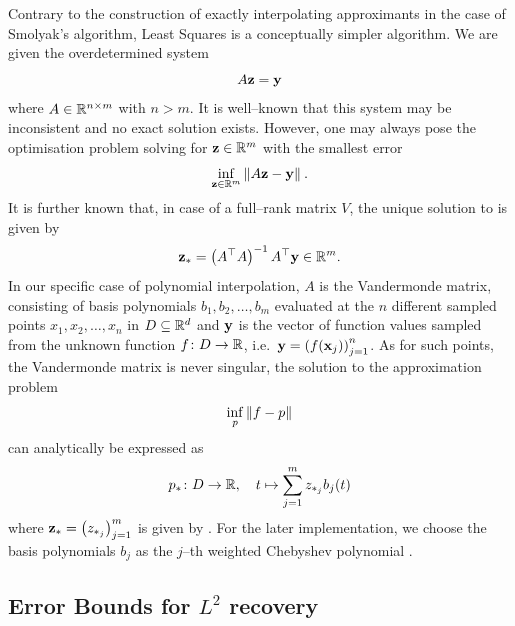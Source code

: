 \documentclass[12pt, oneside]{amsart}
\theoremstyle{definition}
\theoremstyle{remark}
\numberwithin{equation}{section}
\begin{document}
Contrary to the construction of exactly interpolating approximants in the case 
of Smolyak's algorithm, Least Squares is a conceptually simpler algorithm. We 
are given the overdetermined system \[
A\bfz = \bfy
\]
where \(A \in \R^{n \times m}\) with \(n > m\). It is well--known that this 
system may be inconsistent and no exact solution exists. However, one may 
always pose the optimisation problem solving for \(\bfz \in \R^{m}\) with the 
smallest error
\begin{equation}\label{eq:leastSquares}
	\inf_{\bfz \in \R^{m}} \norm[]{A\bfz - \bfy}.
\end{equation}
It is further known that, in case of a full--rank matrix \(V\), the unique 
solution to  is given by 
\begin{equation}\label{eq:ls_solution_moore_penrose_inverse}
	\bfz_* = \left(A^\top A\right)^{-1} A^\top \bfy \in \R^m.
\end{equation}
In our specific case of polynomial interpolation, \(A\) is the Vandermonde 
matrix, consisting of basis polynomials \(b_1, b_2, \dots, b_m\) evaluated at 
the $n$ different sampled points \(x_1, x_2, \dots, x_n\) in \(D \subseteq 
\R^d\) and \(\bfy\) is the vector of function values sampled from the unknown 
function \(f\from D \to \R\), i.e.\ \(\bfy = \left(f(\bfx_j)\right)_{j=1}^n\). 
As for such points, the Vandermonde matrix is never singular, the solution to 
the approximation problem \[
\inf_{p} \norm[]{f-p}
\]
can analytically be expressed as \[
p_* \from D \to \R,\quad t \mapsto \sum_{j=1}^m z_{*_{j}} b_j(t)
\]
where \(\bfz_* = \left(z_{*_j}\right)_{j=1}^m\) is given by 
.
For the later implementation, we choose the basis polynomials \(b_j\) as the 
\(j\)--th weighted Chebyshev polynomial .

\subsection{Error Bounds for \(L^2\) recovery}

\end{document}
